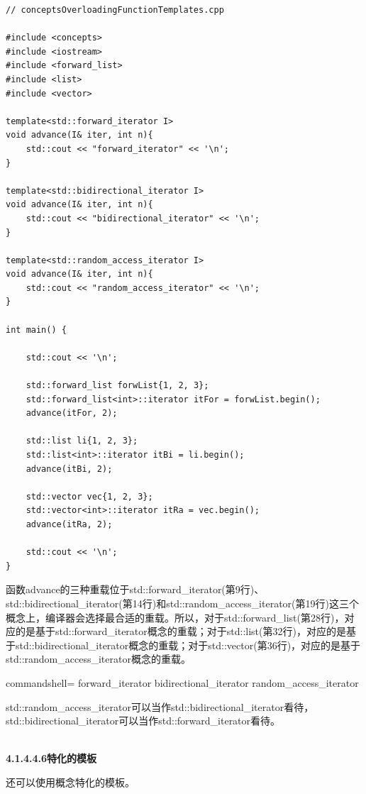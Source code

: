 \begin{lstlisting}[style=styleCXX]
// conceptsOverloadingFunctionTemplates.cpp

#include <concepts>
#include <iostream>
#include <forward_list>
#include <list>
#include <vector>

template<std::forward_iterator I>
void advance(I& iter, int n){
	std::cout << "forward_iterator" << '\n';
}

template<std::bidirectional_iterator I>
void advance(I& iter, int n){
	std::cout << "bidirectional_iterator" << '\n';
}

template<std::random_access_iterator I>
void advance(I& iter, int n){
	std::cout << "random_access_iterator" << '\n';
}

int main() {

	std::cout << '\n';

	std::forward_list forwList{1, 2, 3};
	std::forward_list<int>::iterator itFor = forwList.begin();
	advance(itFor, 2);

	std::list li{1, 2, 3};
	std::list<int>::iterator itBi = li.begin();
	advance(itBi, 2);

	std::vector vec{1, 2, 3};
	std::vector<int>::iterator itRa = vec.begin();
	advance(itRa, 2);

	std::cout << '\n';
}
\end{lstlisting}

函数advance的三种重载位于std::forward\_iterator(第9行)、std::bidirectional\_iterator(第14行)和std::random\_access\_iterator(第19行)这三个概念上，编译器会选择最合适的重载。所以，对于std::forward\_list(第28行)，对应的是基于std::forward\_iterator概念的重载；对于std::list(第32行)，对应的是基于std::bidirectional\_iterator概念的重载；对于std::vector(第36行)，对应的是基于std::random\_access\_iterator概念的重载。

\begin{tcblisting}{commandshell={}}
forward_iterator
bidirectional_iterator
random_access_iterator
\end{tcblisting}

std::random\_access\_iterator可以当作std::bidirectional\_iterator看待，std::bidirectional\_iterator可以当作std::forward\_iterator看待。

\hspace*{\fill} \\ %
\noindent
\textbf{4.1.4.4.6\hspace{0.2cm}特化的模板}

还可以使用概念特化的模板。

